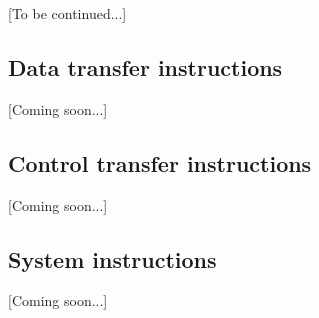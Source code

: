         [To be continued...]

    \subsection{Data transfer instructions}

        [Coming soon...]

    \subsection{Control transfer instructions}

        [Coming soon...]

    \subsection{System instructions}

        [Coming soon...]